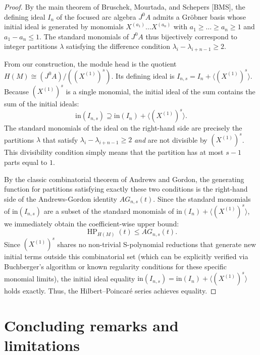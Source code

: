 \documentclass[a4paper, 12pt]{amsart}
\theoremstyle{definition}
\theoremstyle{remark}
\begin{document}
\begin{proof}
  By the main theorem of Bruschek, Mourtada, and Schepers [BMS], the defining ideal $I_n$ of the focused arc algebra $J^0A$ admits a Gröbner basis whose initial ideal is generated by monomials $X^{(a_1)} \dots X^{(a_n)}$ with $a_1 \ge \dots \ge a_n \ge 1$ and $a_1 - a_n \le 1$.
  The standard monomials of $J^0A$ thus bijectively correspond to integer partitions $\lambda$ satisfying the difference condition $\lambda_i - \lambda_{i+n-1} \ge 2$.

  From our construction, the module head is the quotient $H(M) \cong (J^0A) / ((X^{(1)})^s)$. 
  Its defining ideal is $I_{n,s} = I_n + \langle (X^{(1)})^s \rangle$.
  Because $(X^{(1)})^s$ is a single monomial, the initial ideal of the sum contains the sum of the initial ideals:
  \begin{equation*}
    \mathrm{in}(I_{n,s}) \supseteq \mathrm{in}(I_n) + \langle (X^{(1)})^s \rangle.
  \end{equation*}
  The standard monomials of the ideal on the right-hand side are precisely the partitions $\lambda$ that satisfy $\lambda_i - \lambda_{i+n-1} \ge 2$ \emph{and} are not divisible by $(X^{(1)})^s$. This divisibility condition simply means that the partition has at most $s - 1$ parts equal to $1$.
  
  By the classic combinatorial theorem of Andrews and Gordon, the generating function for partitions satisfying exactly these two conditions is the right-hand side of the Andrews-Gordon identity $AG_{n,s}(t)$. 
  Since the standard monomials of $\mathrm{in}(I_{n,s})$ are a subset of the standard monomials of $\mathrm{in}(I_n) + \langle (X^{(1)})^s \rangle$, we immediately obtain the coefficient-wise upper bound:
  \begin{equation*}
    \operatorname{HP}_{H(M)}(t) \le AG_{n,s}(t).
  \end{equation*}
  Since $(X^{(1)})^s$ shares no non-trivial S-polynomial reductions that generate new initial terms outside this combinatorial set (which can be explicitly verified via Buchberger's algorithm or known regularity conditions for these specific monomial limits), the initial ideal equality $\mathrm{in}(I_{n,s}) = \mathrm{in}(I_n) + \langle (X^{(1)})^s \rangle$ holds exactly. Thus, the Hilbert--Poincar\'{e} series achieves equality.
\end{proof}

\section{Concluding remarks and limitations}
\label{sec:concluding-remarks}
\end{document}
